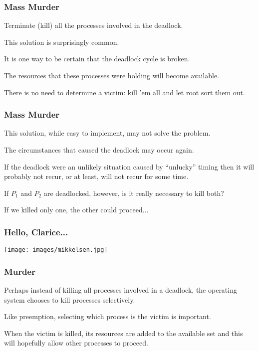 \begin{frame}
	\frametitle{Mass Murder}

	Terminate (kill) all the processes involved in the deadlock.

	This solution is surprisingly common.

	It is one way to be certain that the deadlock cycle is broken.

	The resources that these processes were holding will become available.

	There is no need to determine a victim: kill 'em all and let root sort them out.

\end{frame}

\begin{frame}
	\frametitle{Mass Murder}

	This solution, while easy to implement, may not solve the problem.

	The circumstances that caused the deadlock may occur again.

	If the deadlock were an unlikely situation caused by ``unlucky'' timing then it will probably not recur, or at least, will not recur for some time.

	If $P_{1}$ and $P_{2}$ are deadlocked, however, is it really necessary to kill both?

	If we killed only one, the other could proceed...

\end{frame}


\begin{frame}
	\frametitle{Hello, Clarice...}

	\begin{center}
		\texttt{[image: images/mikkelsen.jpg]}
	\end{center}

\end{frame}


\begin{frame}
	\frametitle{Murder}

	Perhaps instead of killing all processes involved in a deadlock, the operating system chooses to kill processes selectively.

	Like preemption, selecting which process is the victim is important.

	When the victim is killed, its resources are added to the available set and this will hopefully allow other processes to proceed.

\end{frame}

